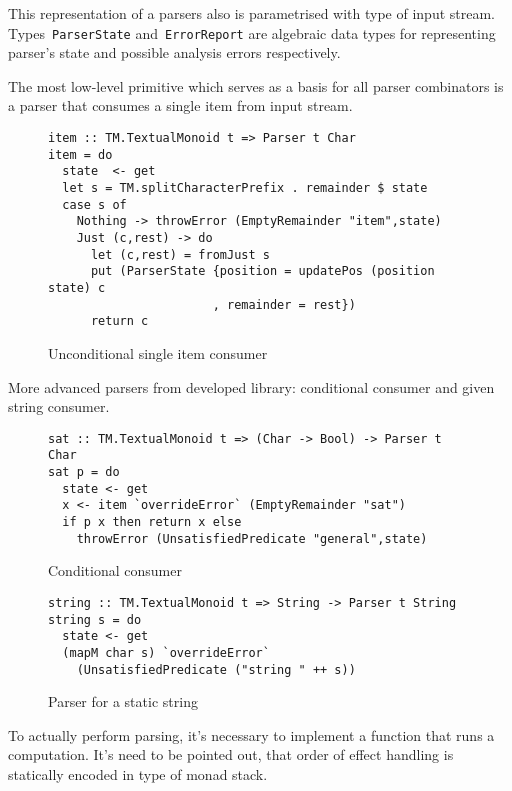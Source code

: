       This representation of a parsers also is parametrised with type of input stream.
      Types~\texttt{ParserState} and~\texttt{ErrorReport} are algebraic
      data types for representing parser's state and possible analysis errors
      respectively.

      The most low-level primitive which serves as a basis for all parser combinators
      is a parser that consumes a single item from input stream.

      \begin{figure}[h]
      \begin{lstlisting}
item :: TM.TextualMonoid t => Parser t Char
item = do
  state  <- get
  let s = TM.splitCharacterPrefix . remainder $ state
  case s of
    Nothing -> throwError (EmptyRemainder "item",state)
    Just (c,rest) -> do
      let (c,rest) = fromJust s
      put (ParserState {position = updatePos (position state) c
                       , remainder = rest})
      return c
      \end{lstlisting}
      \caption{Unconditional single item consumer}
      \label{listing:mtlParserItem}
      \end{figure}

      More advanced parsers from developed library: conditional consumer and
      given string consumer.

      \begin{figure}[h]
      \begin{lstlisting}
sat :: TM.TextualMonoid t => (Char -> Bool) -> Parser t Char
sat p = do
  state <- get
  x <- item `overrideError` (EmptyRemainder "sat")
  if p x then return x else
    throwError (UnsatisfiedPredicate "general",state)
      \end{lstlisting}
      \caption{Conditional consumer}
      \label{listing:mtlParserSat}
      \end{figure}

      \begin{figure}[h]
      \begin{lstlisting}
string :: TM.TextualMonoid t => String -> Parser t String
string s = do
  state <- get
  (mapM char s) `overrideError`
    (UnsatisfiedPredicate ("string " ++ s))
      \end{lstlisting}
      \caption{Parser for a static string}
      \label{listing:mtlParserString}
      \end{figure}

      To actually perform parsing, it's necessary to implement a function that
      runs a computation. It's need to be
      pointed out, that order of effect handling is statically encoded in type of
      monad stack.

